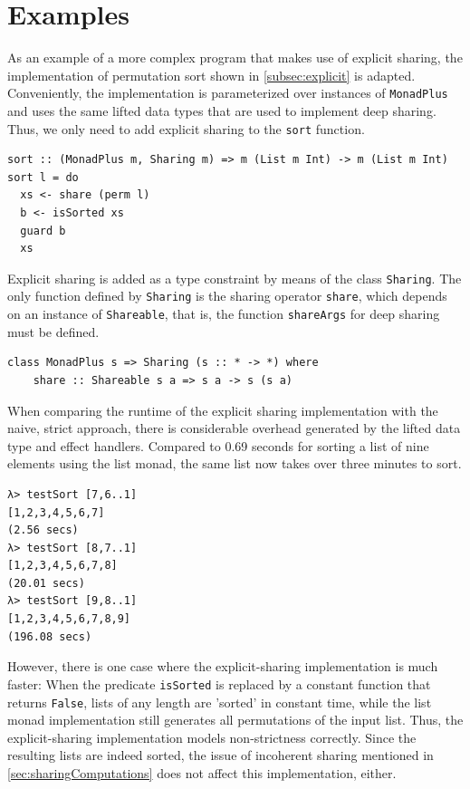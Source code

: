 \documentclass[a4paper, 11pt, fleqn, twoside, abstract=on]{scrreprt}
\newcommand{\hinl}[1]{\texttt{#1}}
\begin{document}
\section{Examples}

As an example of a more complex program that makes use of explicit sharing, the implementation of permutation sort shown in \autoref{subsec:explicit} is adapted.
Conveniently, the implementation is parameterized over instances of \hinl{MonadPlus} and uses the same lifted data types that are used to implement deep sharing.
Thus, we only need to add explicit sharing to the \hinl{sort} function.

\begin{verbatim}
sort :: (MonadPlus m, Sharing m) => m (List m Int) -> m (List m Int)
sort l = do
  xs <- share (perm l)
  b <- isSorted xs
  guard b
  xs
\end{verbatim}
\noindent
Explicit sharing is added as a type constraint by means of the class \hinl{Sharing}.
The only function defined by \hinl{Sharing} is the sharing operator \hinl{share}, which depends on an instance of \hinl{Shareable}, that is, the function \hinl{shareArgs} for deep sharing must be defined.

\begin{verbatim}
class MonadPlus s => Sharing (s :: * -> *) where
    share :: Shareable s a => s a -> s (s a)
\end{verbatim}

When comparing the runtime of the explicit sharing implementation with the naive, strict approach, there is considerable overhead generated by the lifted data type and effect handlers.
Compared to 0.69 seconds for sorting a list of nine elements using the list monad, the same list now takes over three minutes to sort.

\begin{verbatim}
λ> testSort [7,6..1]
[1,2,3,4,5,6,7]
(2.56 secs)
λ> testSort [8,7..1]
[1,2,3,4,5,6,7,8]
(20.01 secs)
λ> testSort [9,8..1]
[1,2,3,4,5,6,7,8,9]
(196.08 secs)
\end{verbatim}

However, there is one case where the explicit-sharing implementation is much faster:
When the predicate \hinl{isSorted} is replaced by a constant function that returns \hinl{False}, lists of any length are 'sorted' in constant time, while the list monad implementation still generates all permutations of the input list.
Thus, the explicit-sharing implementation models non-strictness correctly.
Since the resulting lists are indeed sorted, the issue of incoherent sharing mentioned in \autoref{sec:sharingComputations} does not affect this implementation, either.
\end{document}
